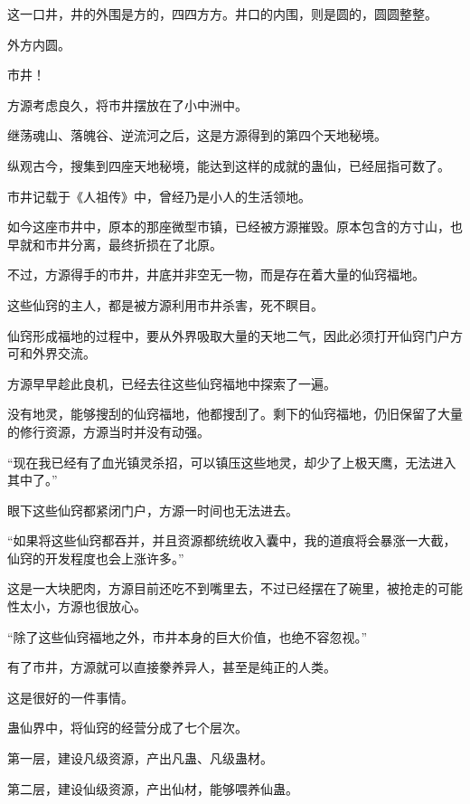 
\begin{this_body}



这一口井，井的外围是方的，四四方方。井口的内围，则是圆的，圆圆整整。

外方内圆。

市井！

方源考虑良久，将市井摆放在了小中洲中。

继荡魂山、落魄谷、逆流河之后，这是方源得到的第四个天地秘境。

纵观古今，搜集到四座天地秘境，能达到这样的成就的蛊仙，已经屈指可数了。

市井记载于《人祖传》中，曾经乃是小人的生活领地。

如今这座市井中，原本的那座微型市镇，已经被方源摧毁。原本包含的方寸山，也早就和市井分离，最终折损在了北原。

不过，方源得手的市井，井底并非空无一物，而是存在着大量的仙窍福地。

这些仙窍的主人，都是被方源利用市井杀害，死不瞑目。

仙窍形成福地的过程中，要从外界吸取大量的天地二气，因此必须打开仙窍门户方可和外界交流。

方源早早趁此良机，已经去往这些仙窍福地中探索了一遍。

没有地灵，能够搜刮的仙窍福地，他都搜刮了。剩下的仙窍福地，仍旧保留了大量的修行资源，方源当时并没有动强。

“现在我已经有了血光镇灵杀招，可以镇压这些地灵，却少了上极天鹰，无法进入其中了。”

眼下这些仙窍都紧闭门户，方源一时间也无法进去。

“如果将这些仙窍都吞并，并且资源都统统收入囊中，我的道痕将会暴涨一大截，仙窍的开发程度也会上涨许多。”

这是一大块肥肉，方源目前还吃不到嘴里去，不过已经摆在了碗里，被抢走的可能性太小，方源也很放心。

“除了这些仙窍福地之外，市井本身的巨大价值，也绝不容忽视。”

有了市井，方源就可以直接豢养异人，甚至是纯正的人类。

这是很好的一件事情。

蛊仙界中，将仙窍的经营分成了七个层次。

第一层，建设凡级资源，产出凡蛊、凡级蛊材。

第二层，建设仙级资源，产出仙材，能够喂养仙蛊。


\end{this_body}
